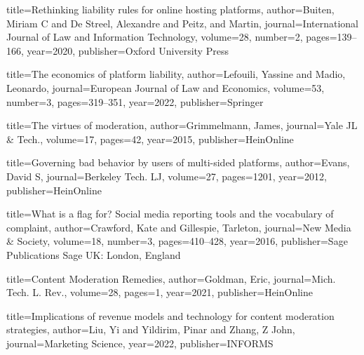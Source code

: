 {
  title={Rethinking liability rules for online hosting platforms},
  author={Buiten, Miriam C and De Streel, Alexandre and Peitz, and Martin},
  journal={International Journal of Law and Information Technology},
  volume={28},
  number={2},
  pages={139--166},
  year={2020},
  publisher={Oxford University Press}
}

{
  title={The economics of platform liability},
  author={Lefouili, Yassine and Madio, Leonardo},
  journal={European Journal of Law and Economics},
  volume={53},
  number={3},
  pages={319--351},
  year={2022},
  publisher={Springer}
}




{
  title={The virtues of moderation},
  author={Grimmelmann, James},
  journal={Yale JL \& Tech.},
  volume={17},
  pages={42},
  year={2015},
  publisher={HeinOnline}
}


{
  title={Governing bad behavior by users of multi-sided platforms},
  author={Evans, David S},
  journal={Berkeley Tech. LJ},
  volume={27},
  pages={1201},
  year={2012},
  publisher={HeinOnline}
}

{
  title={What is a flag for? Social media reporting tools and the vocabulary of complaint},
  author={Crawford, Kate and Gillespie, Tarleton},
  journal={New Media \& Society},
  volume={18},
  number={3},
  pages={410--428},
  year={2016},
  publisher={Sage Publications Sage UK: London, England}
}

{
  title={Content Moderation Remedies},
  author={Goldman, Eric},
  journal={Mich. Tech. L. Rev.},
  volume={28},
  pages={1},
  year={2021},
  publisher={HeinOnline}
}


{
  title={Implications of revenue models and technology for content moderation strategies},
  author={Liu, Yi and Yildirim, Pinar and Zhang, Z John},
  journal={Marketing Science},
  year={2022},
  publisher={INFORMS}
}


